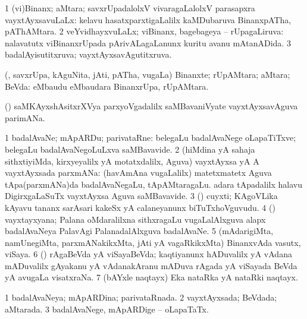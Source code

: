 \bentry
{} 
\gl{\gu}
\expl{}
\bmng
\bnum
\num{1} (vi)Binanx; aMtara; savxrUpadalolxV vivaragaLalolxV parasapxra vayxtAyxsavuLaLx:  kelavu hasatxparxtigaLalilx kaMDubaruva BinanxpATha, pAThAMtara. 
\num{2} veYvidhayxvuLaLx; viBinanx, bagebageya -- rUpagaLiruva:  nalavatutx viBinanxrUpada pArivALagaLanunx kuritu avanu mAtanADida. 
\num{3} badalAyisutitxruva; vayxtAyxsavAgutitxruva. 
\enum
\emng
\eentry

\bentry
{} 
\gl{\nA}
\expl{}
\bmng
 (\rUpa, savxrUpa, kAguNita, jAti, pATha, \mo vugaLa) Binanxte; rUpAMtara; aMtara; BeVda:  eMbaudu  eMbaudara BinanxrUpa, rUpAMtara. 
\emng
\eentry

\bentry
{} 
\gl{\nA}
\expl{}
\bmng
 (\saMshA) saMKAyxshAsitxrXVya parxyoVgadalilx saMBavaniVyate vayxtAyxsavAguva parimANa. 
\emng
\eentry

\bentry
{} 
\gl{\nA}
\expl{}
\bmng
\bnum
\num{1} badalAvaNe; mApARDu; parivataRne:  belegaLu badalAvaNege oLapaTiTxve; belegaLu badalAvaNegoLuLxva saMBavavide. 
\num{2} (hiMdina yA sahaja sithxtiyiMda, kirxyeyalilx yA motatxdalilx, Aguva) vayxtAyxsa yA A vayxtAyxsada parxmANa:  (havAmAna \mo vugaLalilx) matetxmatetx Aguva tApa(parxmANa)da badalAvaNegaLu, tApAMtaragaLu.  adara tApadalilx halavu DigirxgaLaSuTx vayxtAyxsa Aguva saMBavavide. 
\num{3} (\Kavi) cuyxti; KAgoVLika kAyavu tananx sarAsari kakeSx yA calaneyanunx biTuTxhoVguvudu. 
\num{4} (\ga) vayxtayxyana; Palana oMdaralilxna sithxragaLu \mo vugaLalAlxguva alapx badalAvaNeya PalavAgi PalanadalAlxguva badalAvaNe. 
\num{5} (mAdarigiMta, namUnegiMta, parxmANakikxMta, jAti yA vagaRkikxMta) BinanxvAda vasutx, viSaya. 
\num{6} (\saM) rAgaBeVda yA viSayaBeVda; kaqtiyanunx hADuvalilx yA vAdana mADuvalilx gAyakanu yA vAdanakAranu mADuva rAgada yA viSayada BeVda yA avugaLa visatxraNa. 
\num{7} (bAYxle naqtayx) Eka nataRka yA nataRki naqtayx. 
\enum
\emng
\eentry

\bentry
{} 
\gl{\gu}
\expl{}
\bmng
\bnum
\num{1} badalAvaNeya; mApARDina; parivataRnada. 
\num{2} vayxtAyxsada; BeVdada; aMtarada. 
\num{3} badalAvaNege, mApARDige -- oLapaTaTx. 
\enum
\emng
\eentry

